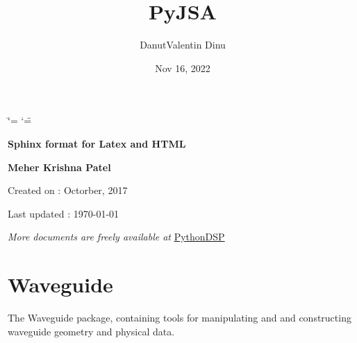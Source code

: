\documentclass[a4paper,10pt,english]{sphinxmanual}
\title{PyJSA}
\date{Nov 16, 2022}
\author{Danut\sphinxhyphen{}Valentin Dinu}
\begin{document}
\ifdefined\shorthandoff
  \ifnum\catcode`\=\string=\active\shorthandoff{=}\fi
  \ifnum\catcode`\"=\active{}\fi
\fi

\pagestyle{empty}


        \begin{titlepage}
            \centering

            \vspace*{40mm} %
            \textbf{\Huge {Sphinx format for Latex and HTML}}

            \vspace{0mm}

            \vspace{0mm}
            \Large \textbf{{Meher Krishna Patel}}

            \small Created on : Octorber, 2017

            \vspace*{0mm}
            \small  Last updated : \MonthYearFormat\today


            \vfill
            \small \textit{More documents are freely available at }{\href{http://pythondsp.readthedocs.io/en/latest/pythondsp/toc.html}{PythonDSP}}
        \end{titlepage}

        \clearpage
        \tableofcontents
        \listoffigures
        \listoftables
        \clearpage

        
\pagestyle{plain}
 
\pagestyle{normal}
\label{\detokenize{index::doc}}


\sphinxstepscope


\chapter{Waveguide}
\label{\detokenize{waveguide:module-pyjsa.waveguide}}\label{\detokenize{waveguide:waveguide}}\label{\detokenize{waveguide::doc}}
\sphinxAtStartPar
The Waveguide package, containing tools for manipulating and and constructing waveguide geometry and physical data.
\end{document}
